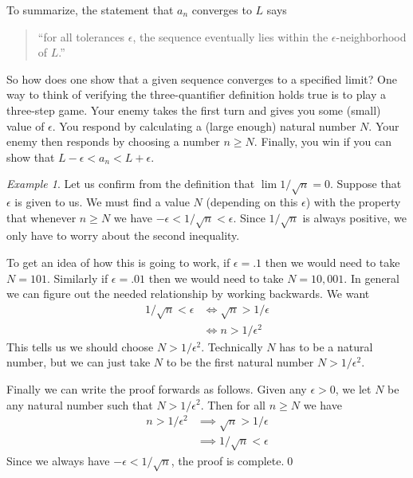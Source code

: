 \documentclass[11pt,oneside]{amsbook}
\theoremstyle{definition}
\theoremstyle{plain}
\theoremstyle{definition}
\theoremstyle{remark}
\newtheorem{example}[theorem]{Example}
\numberwithin{equation}{section}
\numberwithin{figure}{section}
\begin{document}
To summarize, the statement that $a_n$ converges to $L$ says
\begin{quotation}
 ``for all tolerances $\epsilon$, the sequence eventually lies within the $\epsilon$-neighborhood of $L$.''
\end{quotation}

So how does one show that a given sequence converges to a specified limit? One way to think of verifying the three-quantifier definition holds true is to play a three-step game. Your enemy takes the first turn and gives you some (small) value of $\epsilon$. You respond by calculating a (large enough) natural number $N$. Your enemy then responds by choosing a number $n\geq N$. Finally, you win if you can show that $L-\epsilon<a_n<L+\epsilon$.

\begin{example}
  Let us confirm from the definition that $\lim1/\sqrt{n}=0$. Suppose that $\epsilon$ is given to us. We must find a value $N$ (depending on this $\epsilon$) with the property that whenever $n\geq N$ we have $-\epsilon<1/\sqrt{n}<\epsilon$. Since $1/\sqrt{n}$ is always positive, we only have to worry about the second inequality.

  To get an idea of how this is going to work, if $\epsilon=.1$ then we would need to take $N=101$. Similarly if $\epsilon=.01$ then we would need to take $N=10,001$. In general we can figure out the needed relationship by working backwards. We want
  \begin{align*}
    1/\sqrt{n}<\epsilon &\iff \sqrt{n}>1/\epsilon\\
                        &\iff n>1/\epsilon^2
  \end{align*}
  This tells us we should choose $N>1/\epsilon^2$. Technically $N$ has to be a natural number, but we can just take $N$ to be the first natural number $N>1/\epsilon^2$.

  Finally we can write the proof forwards as follows. Given any $\epsilon>0$, we let $N$ be any natural number such that $N>1/\epsilon^2$. Then for all $n\geq N$ we have
  \begin{align*}
    n>1/\epsilon^2&\implies\sqrt{n}>1/\epsilon\\
                  &\implies1/\sqrt{n}<\epsilon
  \end{align*}
  Since we always have $-\epsilon<1/\sqrt{n}$, the proof is complete.\qed
\end{example}
\end{document}
